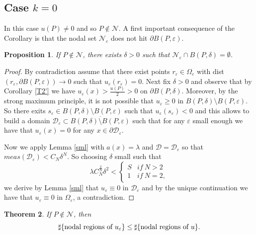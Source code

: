 \documentclass[11pt,reqno]{article}
\newtheorem{teo}{Theorem}[section]
\newtheorem{prop}[teo]{Proposition}
\numberwithin{equation}{section}
\newcommand\e\varepsilon
\renewcommand\O\Omega
\begin{document}
	\subsection{Case $k=0$}
	\vskip0.2cm
    In this case $u(P)\ne0$ and so $P\notin\mathcal{N}$. A first important consequence of the Corollary is that the nodal set $\mathcal{N_\e}$ does not hit $\partial B(P,\e)$.
	\begin{prop}\label{p0}
		 If $P\notin\mathcal{N}$, there exists $\delta>0$ such that  $\mathcal{N_\e}\cap B(P,\delta)=\emptyset$.
	\end{prop}
	\begin{proof}
		By contradiction assume that there exist points $r_\e\in\O_\e$ with dist$(r_\e,\partial B(P,\e))\to0$ such that $u_\e(r_\e)=0$. Next fix $\delta>0$ and observe that  by Corollary \ref{T2'} we have 
$u_\e(x)>\frac{u(P)}2>0$ on $\partial B(P,\delta)$. Moreover, by the strong maximum principle, it is not possible that $u_\e\ge0$ in $B(P,\delta)\setminus B(P,\e)$. So there exits $s_\e\in B(P,\delta)\setminus B(P,\e)$ such that $u_\e(s_\e)<0$ and this allows to build a domain 
 $\mathcal{D}_\e\subset \overline{B(P,\delta)\setminus B(P,\e)}$ such that for any $\e$ small enough we have that $u_\e(x)=0$ for any $x\in\partial \mathcal{D}_\e$.
        
		Now we apply Lemma \ref{sml} with $a(x)=\lambda$ and $\mathcal{D}=\mathcal{D}_\e$ so that $meas(\mathcal{D}_\e)<C_N\delta^N$. So choosing $\delta$ small such that $$\lambda C_N^\frac2N\delta^2<
		\begin{cases}
			S&if\ N>2\\
			1&if\ N=2,
		\end{cases}$$ 
		we derive by Lemma \ref{sml} that $u_\e\equiv0$ in $\mathcal{D}_\e$ and by the unique continuation we have that $u_\e\equiv0$ in $\Omega_\e$, a contradiction.
	\end{proof}
    \begin{teo}\label{th-0804}
    If $P\notin \mathcal{N}$, then 
          $$
    \sharp\{\hbox{nodal regions of } u_{\e}\}\leq \sharp \{\hbox{nodal regions of } u\}.
    $$
    \end{teo}
\end{document}
